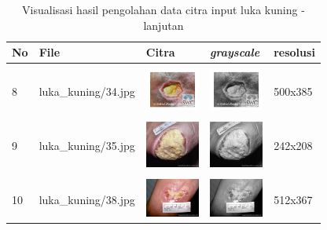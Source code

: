 \begin{table}[H]
	\centering
	\caption{Visualisasi hasil pengolahan data citra input luka kuning - lanjutan}
	\label{tabel_input_6}
	\begin{tabular}{|m{0.2in}|m{1.2in}|m{0.7in}|m{0.7in}|m{0.7in}|}
		\hline
		\textbf{No} & \textbf{File} & \textbf{Citra} & \textbf{\emph{grayscale}} & \textbf{resolusi} \\
		\hline
		
		& &  &  &\\
		8 & 
		luka\_kuning/34.jpg &
		\includegraphics[width=0.7in]{dataset/dataset_3/luka_kuning/ready/34.jpg}&
		\includegraphics[width=0.7in]{dataset/dataset_3/luka_kuning/ready/34_gray.jpg}&
		500x385\\
		\hline
		
		& &  &  &\\
		9& 
		luka\_kuning/35.jpg &
		\includegraphics[width=0.7in]{dataset/dataset_3/luka_kuning/ready/35.jpg}&
		\includegraphics[width=0.7in]{dataset/dataset_3/luka_kuning/ready/35_gray.jpg}&
		242x208\\
		\hline
		
		& &  &  &\\
		10& 
		luka\_kuning/38.jpg &
		\includegraphics[width=0.7in]{dataset/dataset_3/luka_kuning/ready/38.jpg}&
		\includegraphics[width=0.7in]{dataset/dataset_3/luka_kuning/ready/38_gray.jpg}&
		512x367\\
		\hline
		

\end{tabular}
\end{table}
